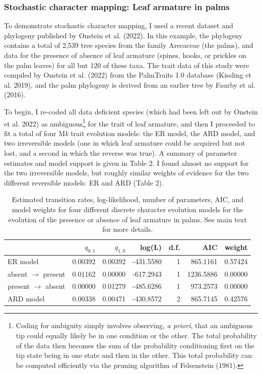 \documentclass{article}
\begin{document}
\subsubsection{Stochastic character mapping: Leaf armature in palms}\label{stochastic-character-mapping-leaf-armature-in-palms}

To demonstrate stochastic character mapping, I used a recent dataset and phylogeny published by Onstein et al. (2022). In this example, the phylogeny contains a total of 2,539 tree species from the family Arecaceae (the palms), and data for the presence of absence of leaf armature (spines, hooks, or prickles on the palm leaves) for all but 120 of these taxa. The trait data of this study were compiled by Onstein et al. (2022) from the PalmTraits 1.0 database (Kissling et al. 2019), and the palm phylogeny is derived from an earlier tree by Faurby et al. (2016).

To begin, I re-coded all data deficient species (which had been left out by Onstein et al. 2022) as ambiguous\footnote{Coding for ambiguity simply involves observing, \emph{a priori}, that an ambiguous tip could equally likely be in one condition or the other. The total probability of the data then becomes the sum of the probability conditioning first on the tip state being in one state and then in the other. This total probability can be computed efficiently via the pruning algorithm of Felsenstein (1981).} for the trait of leaf armature, and then I proceeded to fit a total of four M\emph{k} trait evolution models: the ER model, the ARD model, and two irreversible models (one in which leaf armature could be acquired but not lost, and a second in which the reverse was true). A summary of parameter estimates and model support is given in Table 2. I found almost no support for the two irreversible models, but roughly similar weights of evidence for the two different reversible models: ER and ARD (Table 2).

\begin{table}

\caption{\label{tab:unnamed-chunk-28}Estimated transition rates, log-likelihood, number of parameters, AIC, and model weights for four different discrete character evolution models for the evolution of the presence or absence of leaf armature in palms. See main text for more details.}
\centering
\begin{tabular}[t]{l|r|r|r|r|r|r}
\hline
  & $q_{0,1}$ & $q_{1,0}$ & log(L) & d.f. & AIC & weight\\
\hline
ER model & 0.00392 & 0.00392 & -431.5580 & 1 & 865.1161 & 0.57424\\
\hline
absent $\rightarrow$ present & 0.01162 & 0.00000 & -617.2943 & 1 & 1236.5886 & 0.00000\\
\hline
present $\rightarrow$ absent & 0.00000 & 0.01279 & -485.6286 & 1 & 973.2573 & 0.00000\\
\hline
ARD model & 0.00338 & 0.00471 & -430.8572 & 2 & 865.7145 & 0.42576\\
\hline
\end{tabular}
\end{table}
\end{document}
